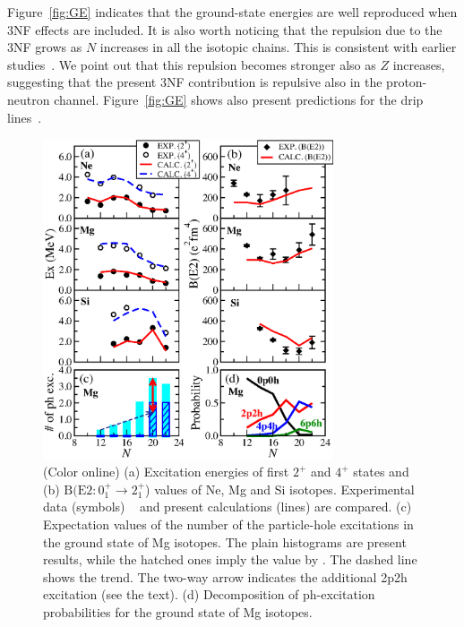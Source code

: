 \documentclass[aps,prl,twocolumn,groupedaddress,showkeys,showpacs,floatfix,superscriptaddress]{revtex4-1}
\newcommand\+{^\dagger}
\begin{document}
Figure~\ref{fig:GE} indicates that the ground-state energies are well
reproduced  when 3NF effects are included.
It is also worth noticing that the repulsion due to the 3NF
grows as $N$ increases in all the isotopic chains. This is 
consistent with earlier studies~\cite{PhysRevLett.105.032501,Holt:2014uc}.
We point out that this repulsion becomes stronger also as $Z$ increases,
suggesting that the present 3NF contribution is repulsive also in the proton-neutron 
channel. 
Figure~\ref{fig:GE} shows also present predictions for the drip lines~\cite{koura2005,Erler:2012cc}.

\begin{figure}[tbp]
 \includegraphics[width=8.5725cm,angle=0,clip]{Fig2.eps}
 \caption{(Color online)
 (a) Excitation energies of first $2^{+}$
  and $4^{+}$ states and (b) $\mathrm{B(E2}: 0_1^{+}\rightarrow 2_1^{+}$) values 
  of Ne, Mg and Si isotopes.
 Experimental data (symbols) ~\cite{NationalNuclearDataCenter:2008tv,Takeuchi:2012ch} 
 and present calculations (lines) are compared.
 (c) Expectation values of the number of the particle-hole excitations in the ground state of Mg isotopes.
   The plain histograms are present results, while the hatched ones imply the value 
   by \cite{Warburton:1990vw}.  The dashed line shows the trend.
   The two-way arrow indicates the additional 2p2h excitation (see the text).  
   (d) Decomposition of ph-excitation probabilities for the ground state of Mg isotopes. }
  \label{fig:E2_BE2}
\end{figure}
\end{document}
